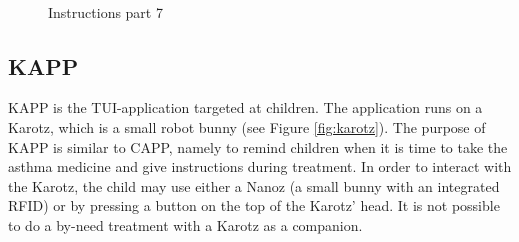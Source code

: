 \begin{figure}[H]
	\begin{minipage}[b]{0.3\linewidth}
		\centering
		\caption{\\ Instructions part 7}
		\label{fig:instructions-7}
	\end{minipage}
\end{figure}


\subsection{KAPP}
\label{sec:description-kapp}
KAPP is the TUI-application targeted at children. The application runs on a Karotz, which is a small robot bunny (see Figure \ref{fig:karotz}). The purpose of KAPP is similar to CAPP, namely to remind children when it is time to take the asthma medicine and give instructions during treatment. In order to interact with the Karotz, the child may use either a Nanoz (a small bunny with an integrated RFID) or by pressing a button on the top of the Karotz' head. It is not possible to do a by-need treatment with a Karotz as a companion. 


